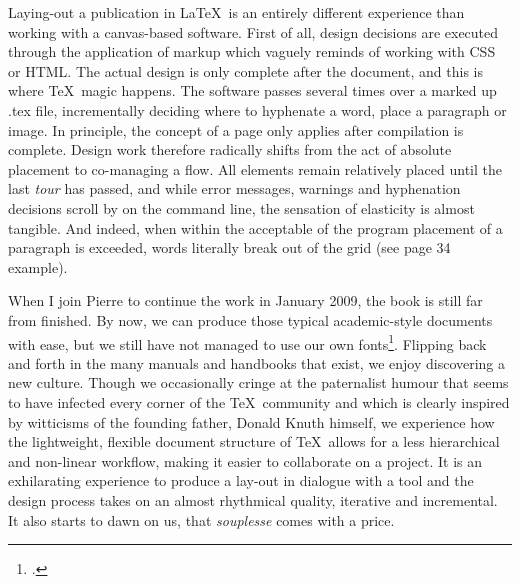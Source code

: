 Laying-out a publication in \LaTeX\ is an entirely different experience
than working with a canvas-based software. First of all, design
decisions are executed through the application of markup which vaguely
reminds of working with CSS or HTML. The actual design is only complete
after  the document, and
this is where \TeX\ magic happens. The software passes several times over
a marked up .tex file, incrementally deciding where to hyphenate a
word, place a paragraph or image. In principle, the concept of a page
only applies after compilation is complete. Design work therefore
radically shifts from the act of absolute placement to co-managing a
flow. All elements remain relatively placed until the last {\em 
tour} has passed, and while error messages, warnings and hyphenation
decisions scroll by on the command line, the sensation of elasticity is
almost tangible. And indeed, when within the acceptable
 of the program placement of
a paragraph is exceeded, words literally break out of the grid (see
page 34 example).

When I join Pierre to continue the work in January 2009, the book is
still far from finished. By now, we can produce those typical
academic-style documents with ease, but we still have not managed to
use our own fonts\footnote{.
}. Flipping back and forth in the many
manuals and handbooks that exist, we enjoy discovering a new culture.
Though we occasionally cringe at the paternalist humour that seems to
have infected every corner of the \TeX\ community and which is clearly
inspired by witticisms of the founding father, Donald Knuth himself, we
experience how the lightweight, flexible document structure of \TeX\
allows for a less hierarchical and non-linear workflow, making it
easier to collaborate on a project. It is an exhilarating experience to
produce a lay-out in dialogue with a tool and the design process
takes on an almost rhythmical quality, iterative and incremental. It
also starts to dawn on us, that {\em souplesse} comes with a price.


